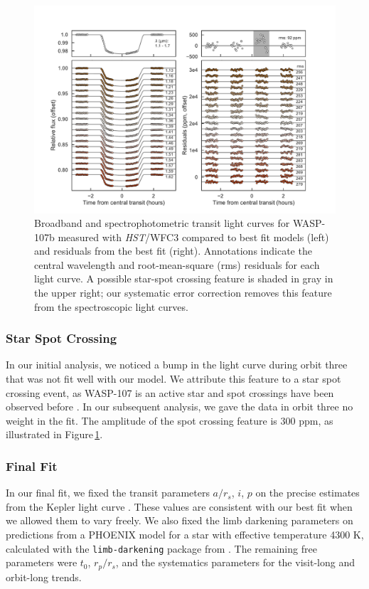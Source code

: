 \documentclass[twocolumn]{aastex61}
\begin{document}
\begin{figure}
\includegraphics[width = \textwidth]{Figures/lc.pdf}
\caption{Broadband and spectrophotometric transit light curves for WASP-107b measured with \textit{HST}/WFC3 compared to best fit models (left) and residuals from the best fit (right). Annotations indicate the central wavelength and root-mean-square (rms) residuals for each light curve. A possible star-spot crossing feature is shaded in gray in the upper right; our systematic error correction removes this feature from the spectroscopic light curves.} 
\label{fig:lc}
\end{figure}

\subsubsection{Star Spot Crossing}
In our initial analysis, we noticed a bump in the light curve during orbit three that was not fit well with our model. We attribute this feature to a star spot crossing event, as WASP-107 is an active star and spot crossings have been observed before \citep{dai17, mocnik17}. In our subsequent analysis, we gave the data in orbit three no weight in the fit. The amplitude of the spot crossing feature is 300 ppm, as illustrated in Figure\,\ref{fig:lc}.

\subsubsection{Final Fit}
In our final fit, we fixed the transit parameters $a/r_s$, $i$, $p$ on the precise estimates from the Kepler light curve \citep{dai17}.  These values are consistent with our best fit when we allowed them to vary freely. We also fixed the limb darkening parameters on predictions from a PHOENIX model for a star with effective temperature 4300 K, calculated with the \texttt{limb-darkening} package from \cite{espinoza15}.  The remaining free parameters were $t_0$, $r_p/r_s$, and the systematics parameters for the visit-long and orbit-long trends.
\end{document}
